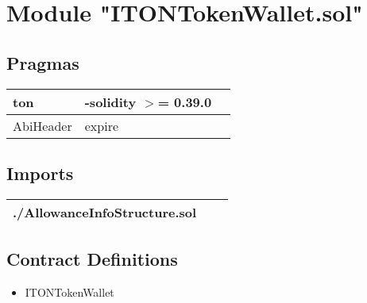 
\section{Module "ITONTokenWallet.sol"}


\subsection{Pragmas}


\noindent\begin{tabular}{|l|l|p{5cm}|}\hline
ton & -solidity $>$= 0.39.0 &\\\hline
AbiHeader &  expire &\\\hline
\end{tabular}


\subsection{Imports}


\noindent\begin{tabular}{|l|l|p{5cm}|}\hline
./AllowanceInfoStructure.sol &\\\hline
\end{tabular}


\subsection{Contract Definitions}

\begin{itemize}
\item ITONTokenWallet
\end{itemize}
